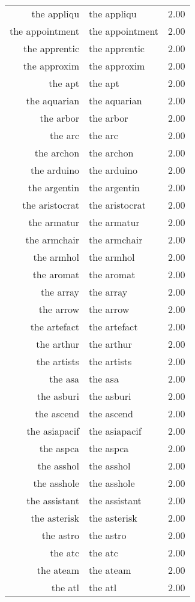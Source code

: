 \begin{table}[ht]
\begin{tabular}{rlr}
  the appliqu & the appliqu & 2.00 \\ 
  the appointment & the appointment & 2.00 \\ 
  the apprentic & the apprentic & 2.00 \\ 
  the approxim & the approxim & 2.00 \\ 
  the apt & the apt & 2.00 \\ 
  the aquarian & the aquarian & 2.00 \\ 
  the arbor & the arbor & 2.00 \\ 
  the arc & the arc & 2.00 \\ 
  the archon & the archon & 2.00 \\ 
  the arduino & the arduino & 2.00 \\ 
  the argentin & the argentin & 2.00 \\ 
  the aristocrat & the aristocrat & 2.00 \\ 
  the armatur & the armatur & 2.00 \\ 
  the armchair & the armchair & 2.00 \\ 
  the armhol & the armhol & 2.00 \\ 
  the aromat & the aromat & 2.00 \\ 
  the array & the array & 2.00 \\ 
  the arrow & the arrow & 2.00 \\ 
  the artefact & the artefact & 2.00 \\ 
  the arthur & the arthur & 2.00 \\ 
  the artists & the artists & 2.00 \\ 
  the asa & the asa & 2.00 \\ 
  the asburi & the asburi & 2.00 \\ 
  the ascend & the ascend & 2.00 \\ 
  the asiapacif & the asiapacif & 2.00 \\ 
  the aspca & the aspca & 2.00 \\ 
  the asshol & the asshol & 2.00 \\ 
  the asshole & the asshole & 2.00 \\ 
  the assistant & the assistant & 2.00 \\ 
  the asterisk & the asterisk & 2.00 \\ 
  the astro & the astro & 2.00 \\ 
  the atc & the atc & 2.00 \\ 
  the ateam & the ateam & 2.00 \\ 
  the atl & the atl & 2.00 \\ 

\end{tabular}
\end{table}
